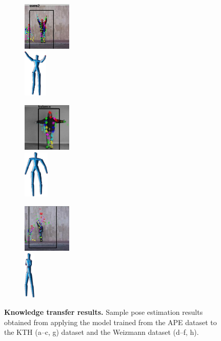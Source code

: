 \begin{figure}
\begin{subfigure}[t]{0.18\linewidth}
		\label{fig/body/others/e}
	\end{subfigure}
	\begin{subfigure}[t]{0.18\linewidth} \centering
		\includegraphics[height=2.3cm]{fig/body/others/weiz2.jpg} \\
		\includegraphics[height=2.3cm]{fig/body/others/weiz2.png} 
		\label{fig/body/others/f}
	\end{subfigure}
	\begin{subfigure}[t]{0.18\linewidth} \centering
		\includegraphics[height=2.3cm]{fig/body/others/ktherr.jpg} \\
		\includegraphics[height=2.3cm]{fig/body/others/ktherr.png} 
		\label{fig/body/others/g}
	\end{subfigure}
	\begin{subfigure}[t]{0.18\linewidth} \centering
		\includegraphics[height=2.3cm]{fig/body/others/weizerr.jpg} \\
		\includegraphics[height=2.3cm]{fig/body/others/weizerr.png} 
		\label{fig/body/others/h}
	\end{subfigure}
	\caption{\textbf{Knowledge transfer results.} Sample pose estimation results obtained from applying the model trained from the APE dataset to the KTH (a--c, g) dataset and the Weizmann dataset (d--f, h).} 
	\label{fig/body/otherresults}
\end{figure}

